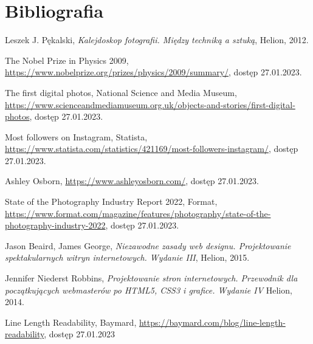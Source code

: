 \documentclass[12pt]{article}
\numberwithin{figure}{section}
\begin{document}
\begin{sloppypar}

\newpage 

%
    \listoftables
    \clearpage


\newpage 

%
    \listofcodes
    \clearpage


\newpage 

\section*{Bibliografia}
    \renewcommand{\section}[2]{}
    
\begin{thebibliography}{99}

    Leszek J. Pękalski,
    \textit{Kalejdoskop fotografii. Między techniką a sztuką},
    Helion,
    2012.

    The Nobel Prize in Physics 2009,
    \url{https://www.nobelprize.org/prizes/physics/2009/summary/}, 
    dostęp 27.01.2023.

    The first digital photos, National Science and Media Museum,
    \url{https://www.scienceandmediamuseum.org.uk/objects-and-stories/first-digital-photos},
    dostęp 27.01.2023.

    Most followers on Instagram, Statista,
    \url{https://www.statista.com/statistics/421169/most-followers-instagram/},
    dostęp 27.01.2023.

    Ashley Osborn,
    \url{https://www.ashleyosborn.com/},
    dostęp 27.01.2023.

    State of the Photography Industry Report 2022, Format,
    \url{https://www.format.com/magazine/features/photography/state-of-the-photography-industry-2022},
    dostęp 27.01.2023.

    Jason Beaird, James George,
    \textit{Niezawodne zasady web designu. Projektowanie spektakularnych witryn internetowych. Wydanie III},
    Helion,
    2015.

    Jennifer Niederst Robbins,
    \textit{Projektowanie stron internetowych. Przewodnik dla początkujących webmasterów po HTML5, CSS3 i grafice. Wydanie IV}
    Helion,
    2014.

    Line Length Readability, Baymard,
    \url{https://baymard.com/blog/line-length-readability},
    dostęp 27.01.2023
        
\end{thebibliography}

\end{sloppypar}
\end{document}
